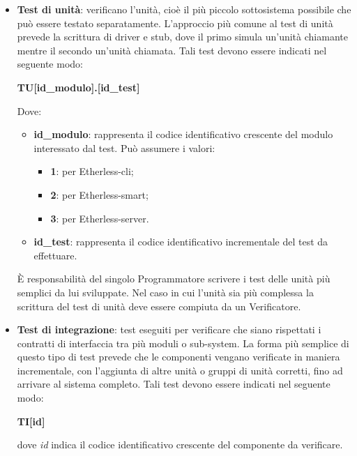        \begin{itemize}
          \item \textbf{Test di unità}: verificano l'unità, cioè il più piccolo sottosistema possibile che può essere testato separatamente. L'approccio più comune al test di unità prevede la scrittura di driver e stub, dove il primo simula un'unità chiamante mentre il secondo un'unità chiamata. Tali test devono essere indicati nel seguente modo: 
          \begin{center}
          	\textbf{TU[id\_modulo].[id\_test]}
          \end{center}
      	  Dove:
      	  \begin{itemize}
      	  	\item \textbf{id\_modulo}: rappresenta il codice identificativo crescente del modulo interessato dal test. Può assumere i valori:
        	\begin{itemize}
        		\item{\textbf{1}: per Etherless-cli;}
        		\item{\textbf{2}: per Etherless-smart;}
        		\item{\textbf{3}: per Etherless-server.}
        	\end{itemize}
      	  	\item \textbf{id\_test}: rappresenta il codice identificativo incrementale del test da effettuare.
      	  \end{itemize}
      	  È responsabilità del singolo Programmatore scrivere i test delle unità più semplici da lui sviluppate. Nel caso in cui l'unità sia più complessa la scrittura del test di unità deve essere compiuta da un Verificatore. 
        
          \item \textbf{Test di integrazione}: test eseguiti per verificare che siano rispettati i contratti di interfaccia tra più moduli o sub-system. La forma più semplice di questo tipo di test prevede che le componenti vengano verificate in maniera incrementale, con l'aggiunta di altre unità o gruppi di unità corretti, fino ad arrivare al sistema completo. Tali test devono essere indicati nel seguente modo: 
          \begin{center}
          	\textbf{TI[id]}
          \end{center}
      		dove \textit{id} indica il codice identificativo crescente del componente da verificare. 
         

\end{itemize}
